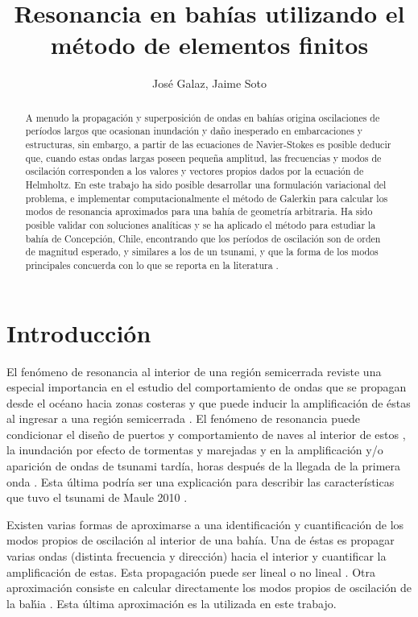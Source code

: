 \documentclass[12pt, letterpaper]{article}
\title{Resonancia en bah\'ias utilizando el m\'etodo de elementos finitos}
\author{Jos\'e Galaz, Jaime Soto}
\date{}
\begin{document}
\maketitle

\begin{abstract}
    A menudo la propagaci\'on y superposici\'on de ondas en bah\'ias origina oscilaciones de per\'iodos largos que ocasionan inundaci\'on y da\~no inesperado en embarcaciones y estructuras, sin embargo, a partir de las ecuaciones de Navier-Stokes es posible deducir que, cuando estas ondas largas poseen peque\~na amplitud, las frecuencias y modos de oscilaci\'on corresponden a los valores y vectores propios dados por la ecuaci\'on de Helmholtz. En este trabajo ha sido posible desarrollar una formulaci\'on variacional del problema, e implementar computacionalmente el m\'etodo de Galerkin para calcular los modos de resonancia aproximados para una bah\'ia de geometr\'ia arbitraria. Ha sido posible validar con soluciones anal\'iticas y se ha aplicado el m\'etodo para estudiar la bah\'ia de Concepci\'on, Chile, encontrando que los per\'iodos de oscilaci\'on son de orden de magnitud esperado, y similares a los de un tsunami, y que la forma de los modos principales concuerda con lo que se reporta en la literatura \cite{Belloti2012}.
\end{abstract}

\section{Introducci\'on}

El fen\'omeno de resonancia al interior de una regi\'on  semicerrada reviste una especial importancia en el estudio del comportamiento de ondas que se propagan desde el oc\'eano hacia zonas costeras y que puede inducir la amplificaci\'on de \'estas al ingresar a una regi\'on semicerrada \cite{Kowalik1993}. El fen\'omeno de resonancia puede condicionar el dise\~no de puertos y comportamiento de naves al interior de estos \cite{Diaz2006web}, la inundaci\'on por efecto de tormentas y marejadas \cite{Kowalik1993} y en la amplificaci\'on y/o aparici\'on de ondas de tsunami tard\'ia, horas despu\'es de la llegada de la primera onda \cite{Kowalik1993}. Esta \'ultima podr\'ia ser una explicaci\'on para describir las caracter\'isticas que tuvo el tsunami de Maule 2010 \cite{Cyper2012web}.

Existen varias formas de aproximarse a una identificaci\'on y cuantificaci\'on de los modos propios de oscilaci\'on al interior de una bah\'ia. Una de \'estas es propagar varias ondas (distinta frecuencia y direcci\'on) hacia el interior y cuantificar la amplificaci\'on de estas. Esta propagaci\'on puede ser lineal o no lineal \cite{Mei2005}. Otra aproximaci\'on consiste en calcular directamente los modos propios de oscilaci\'on de la ba\'hia \cite{Belloti2012, Mei2005}. Esta \'ultima aproximaci\'on es la utilizada en este trabajo.
\end{document}

